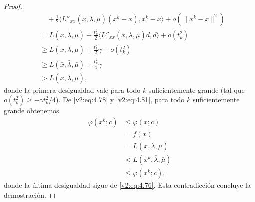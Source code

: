 \begin{proof}
\begin{align}
        &\quad + \frac{1}{2} \langle L''_{xx}(\bar{x}, \bar{\lambda}, \bar{\mu})(x^k - \bar{x}), x^k - \bar{x} \rangle + o(\|x^k - \bar{x}\|^2) \nonumber \\
        &= L(\bar{x}, \bar{\lambda}, \bar{\mu}) + \frac{t_k^2}{2} \langle L''_{xx}(\bar{x}, \bar{\lambda}, \bar{\mu})d, d \rangle + o(t_k^2) \nonumber \\
        &\ge L(\bar{x}, \bar{\lambda}, \bar{\mu}) + \frac{t_k^2}{2} \gamma + o(t_k^2) \nonumber \\
        &\ge L(\bar{x}, \bar{\lambda}, \bar{\mu}) + \frac{t_k^2}{4} \gamma \nonumber \\
        &> L(\bar{x}, \bar{\lambda}, \bar{\mu}),
        \label{v2:eq:4.81}
    \end{align}
    donde la primera desigualdad vale para todo $k$ suficientemente grande (tal que $o(t_k^2) \ge -\gamma t_k^2 / 4$).
    De \eqref{v2:eq:4.78} y \eqref{v2:eq:4.81}, para todo $k$ suficientemente grande obtenemos
    \begin{align*}
        \varphi(x^k; c) &\le \varphi(\bar{x}; c) \\
        &= f(\bar{x}) \\
        &= L(\bar{x}, \bar{\lambda}, \bar{\mu}) \\
        &< L(x^k, \bar{\lambda}, \bar{\mu}) \\
        &\le \varphi(x^k; c),
    \end{align*}
    donde la última desigualdad sigue de \eqref{v2:eq:4.76}. Esta contradicción concluye la demostración.
\end{proof}

